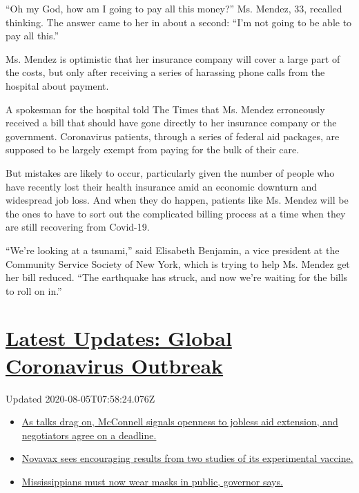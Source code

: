 ``Oh my God, how am I going to pay all this money?'' Ms. Mendez, 33,
recalled thinking. The answer came to her in about a second: ``I'm not
going to be able to pay all this.''

Ms. Mendez is optimistic that her insurance company will cover a large
part of the costs, but only after receiving a series of harassing phone
calls from the hospital about payment.

A spokesman for the hospital told The Times that Ms. Mendez erroneously
received a bill that should have gone directly to her insurance company
or the government. Coronavirus patients, through a series of federal aid
packages, are supposed to be largely exempt from paying for the bulk of
their care.

But mistakes are likely to occur, particularly given the number of
people who have recently lost their health insurance amid an economic
downturn and widespread job loss. And when they do happen, patients like
Ms. Mendez will be the ones to have to sort out the complicated billing
process at a time when they are still recovering from Covid-19.

``We're looking at a tsunami,'' said Elisabeth Benjamin, a vice
president at the Community Service Society of New York, which is trying
to help Ms. Mendez get her bill reduced. ``The earthquake has struck,
and now we're waiting for the bills to roll on in.''

\hypertarget{latest-updates-global-coronavirus-outbreak}{%
\section{\texorpdfstring{\href{https://www.nytimes.com/2020/08/04/world/coronavirus-cases.html?action=click\&pgtype=Article\&state=default\&region=MAIN_CONTENT_1\&context=storylines_live_updates}{Latest
Updates: Global Coronavirus
Outbreak}}{Latest Updates: Global Coronavirus Outbreak}}\label{latest-updates-global-coronavirus-outbreak}}

Updated 2020-08-05T07:58:24.076Z

\begin{itemize}
\tightlist
\item
  \href{https://www.nytimes.com/2020/08/04/world/coronavirus-cases.html?action=click\&pgtype=Article\&state=default\&region=MAIN_CONTENT_1\&context=storylines_live_updates\#link-762df92}{As
  talks drag on, McConnell signals openness to jobless aid extension,
  and negotiators agree on a deadline.}
\item
  \href{https://www.nytimes.com/2020/08/04/world/coronavirus-cases.html?action=click\&pgtype=Article\&state=default\&region=MAIN_CONTENT_1\&context=storylines_live_updates\#link-1228a480}{Novavax
  sees encouraging results from two studies of its experimental
  vaccine.}
\item
  \href{https://www.nytimes.com/2020/08/04/world/coronavirus-cases.html?action=click\&pgtype=Article\&state=default\&region=MAIN_CONTENT_1\&context=storylines_live_updates\#link-794484ed}{Mississippians
  must now wear masks in public, governor says.}
\end{itemize}

